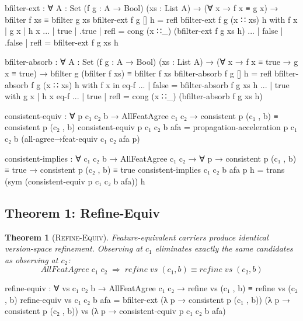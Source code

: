 \documentclass[9pt,a4paper]{article}
\theoremstyle{plain}
\newtheorem{theorem}{Theorem}
\theoremstyle{definition}
\theoremstyle{remark}
\begin{document}
\begin{code}
    bfilter-ext : ∀ {A : Set} (f g : A → Bool) (xs : List A) →
      (∀ x → f x ≡ g x) →
      bfilter f xs ≡ bfilter g xs
    bfilter-ext f g [] h = refl
    bfilter-ext f g (x ∷ xs) h with f x | g x | h x
    ... | true  | .true  | refl = cong (x ∷_) (bfilter-ext f g xs h)
    ... | false | .false | refl = bfilter-ext f g xs h

    bfilter-absorb : ∀ {A : Set} (f g : A → Bool) (xs : List A) →
      (∀ x → f x ≡ true → g x ≡ true) →
      bfilter g (bfilter f xs) ≡ bfilter f xs
    bfilter-absorb f g [] h = refl
    bfilter-absorb f g (x ∷ xs) h with f x in eq-f
    ... | false = bfilter-absorb f g xs h
    ... | true with g x | h x eq-f
    ...   | true | refl = cong (x ∷_) (bfilter-absorb f g xs h)
\end{code}

\begin{code}
    consistent-equiv : ∀ p c₁ c₂ b →
      AllFeatAgree c₁ c₂ →
      consistent p (c₁ , b) ≡ consistent p (c₂ , b)
    consistent-equiv p c₁ c₂ b afa =
      propagation-acceleration p c₁ c₂ b
        (all-agree→feat-equiv c₁ c₂ afa p)

    consistent-implies : ∀ c₁ c₂ b →
      AllFeatAgree c₁ c₂ →
      ∀ p → consistent p (c₁ , b) ≡ true →
            consistent p (c₂ , b) ≡ true
    consistent-implies c₁ c₂ b afa p h =
      trans (sym (consistent-equiv p c₁ c₂ b afa)) h
\end{code}

\subsection{Theorem 1: Refine-Equiv}

\begin{theorem}[\textsc{Refine-Equiv}]
Feature-equivalent carriers produce \emph{identical} version-space refinement.  Observing at $c_1$ eliminates exactly the same candidates as observing at $c_2$:
\[
\mathit{AllFeatAgree}\;c_1\;c_2 \;\Longrightarrow\; \mathit{refine}\;\mathit{vs}\;(c_1, b) \equiv \mathit{refine}\;\mathit{vs}\;(c_2, b)
\]
\end{theorem}

\begin{code}
    refine-equiv : ∀ vs c₁ c₂ b →
      AllFeatAgree c₁ c₂ →
      refine vs (c₁ , b) ≡ refine vs (c₂ , b)
    refine-equiv vs c₁ c₂ b afa =
      bfilter-ext
        (λ p → consistent p (c₁ , b))
        (λ p → consistent p (c₂ , b))
        vs
        (λ p → consistent-equiv p c₁ c₂ b afa)
\end{code}
\end{document}
